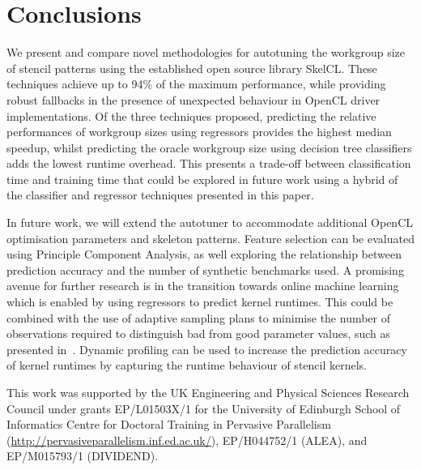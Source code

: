 \documentclass[preprint,nonatbib,10pt,nocopyrightspace]{sigplanconf}
\begin{document}
  \section{Conclusions}\label{sec:conclusions}

  We present and compare novel methodologies for autotuning the workgroup size of
  stencil patterns using the established open source library SkelCL. These
  techniques achieve up to 94\% of the maximum performance, while providing robust
  fallbacks in the presence of unexpected behaviour in OpenCL driver
  implementations. Of the three techniques proposed, predicting the relative
  performances of workgroup sizes using regressors provides the highest median
  speedup, whilst predicting the oracle workgroup size using decision tree
  classifiers adds the lowest runtime overhead. This presents a trade-off between
  classification time and training time that could be explored in future work
  using a hybrid of the classifier and regressor techniques presented in this
  paper.

  In future work, we will extend the autotuner to accommodate additional OpenCL
  optimisation parameters and skeleton patterns. Feature selection can be
  evaluated using Principle Component Analysis, as well exploring the relationship
  between prediction accuracy and the number of synthetic benchmarks used. A
  promising avenue for further research is in the transition towards online
  machine learning which is enabled by using regressors to predict kernel
  runtimes. This could be combined with the use of adaptive sampling plans to
  minimise the number of observations required to distinguish bad from good
  parameter values, such as presented in~\cite{Leather2009}. Dynamic profiling can
  be used to increase the prediction accuracy of kernel runtimes by capturing the
  runtime behaviour of stencil kernels.


  \acks

  This work was supported by the UK Engineering and Physical Sciences Research
  Council under grants EP/L01503X/1 for the University of Edinburgh School of
  Informatics Centre for Doctoral Training in Pervasive Parallelism
  (\url{http://pervasiveparallelism.inf.ed.ac.uk/}), EP/H044752/1 (ALEA), and
  EP/M015793/1 (DIVIDEND).

  \label{bibliography}
  \printbibliography
\end{document}
